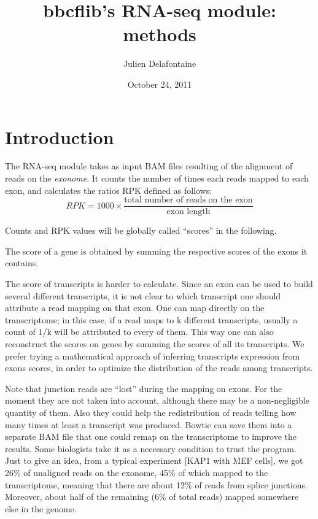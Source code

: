 \documentclass[a4paper,11pt]{article}
\title{bbcflib's RNA-seq module: methods}
\date{October 24, 2011}
\author{Julien Delafontaine}
\begin{document}
\maketitle

\section{Introduction}

The RNA-seq module takes as input BAM files resulting of the alignment of reads on the \emph{exonome}. It counts the number of times each reads mapped to each exon, and calculates the ratios RPK defined as follows:
$$ RPK = 1000\times \frac{\text{total number of reads on the exon}}{\text{exon length}} $$

Counts and RPK values will be globally called ``scores'' in the following.

The score of a gene is obtained by summing the respective scores of the exons it contains.

The score of transcripts is harder to calculate. Since an exon can be used to build several different transcripts, it is not clear to which transcript one should attribute a read mapping on that exon. One can map directly on the transcriptome; in this case, if a read maps to k different transcripts, usually a count of 1/k will be attributed to every of them. This way one can also reconstruct the scores on genes by summing the scores of all its transcripts. We prefer trying a mathematical approach of inferring transcripts expression from exons scores, in order to optimize the distribution of the reads among transcripts.

Note that junction reads are ``lost'' during the mapping on exons. For the moment they are not taken into account, although there may be a non-negligible quantity of them. Also they could help the redistribution of reads telling how many times at least a transcript was produced. Bowtie can save them into a separate BAM file that one could remap on the transcriptome to improve the results. Some biologists take it as a necessary condition to trust the program. Just to give an idea, from a typical experiment [KAP1 with MEF cells], we got 26\% of unaligned reads on the exonome, 45\% of which mapped to the transcriptome, meaning that there are about 12\% of reads from splice junctions. Moreover, about half of the remaining (6\% of total reads) mapped somewhere else in the genome.

\end{document}
